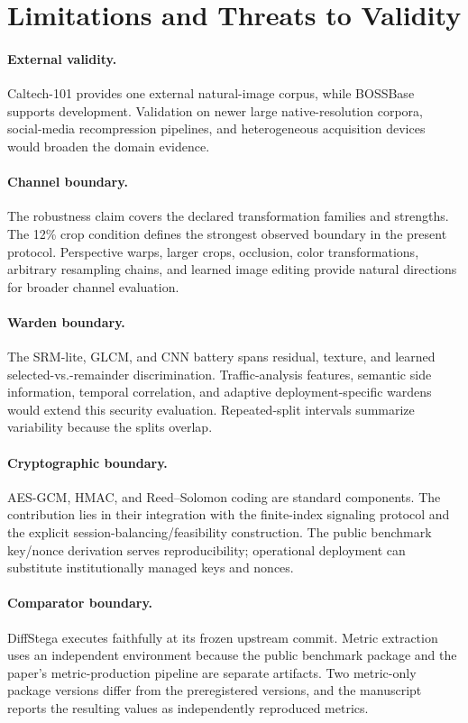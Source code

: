 \section{Limitations and Threats to Validity}
\label{sec:limitations}

\paragraph{External validity.} Caltech-101 provides one external natural-image corpus, while BOSSBase supports development. Validation on newer large native-resolution corpora, social-media recompression pipelines, and heterogeneous acquisition devices would broaden the domain evidence.

\paragraph{Channel boundary.} The robustness claim covers the declared transformation families and strengths. The 12\% crop condition defines the strongest observed boundary in the present protocol. Perspective warps, larger crops, occlusion, color transformations, arbitrary resampling chains, and learned image editing provide natural directions for broader channel evaluation.

\paragraph{Warden boundary.} The SRM-lite, GLCM, and CNN battery spans residual, texture, and learned selected-vs.-remainder discrimination. Traffic-analysis features, semantic side information, temporal correlation, and adaptive deployment-specific wardens would extend this security evaluation. Repeated-split intervals summarize variability because the splits overlap.

\paragraph{Cryptographic boundary.} AES-GCM, HMAC, and Reed--Solomon coding are standard components. The contribution lies in their integration with the finite-index signaling protocol and the explicit session-balancing/feasibility construction. The public benchmark key/nonce derivation serves reproducibility; operational deployment can substitute institutionally managed keys and nonces.

\paragraph{Comparator boundary.} DiffStega executes faithfully at its frozen upstream commit. Metric extraction uses an independent environment because the public benchmark package and the paper's metric-production pipeline are separate artifacts. Two metric-only package versions differ from the preregistered versions, and the manuscript reports the resulting values as independently reproduced metrics.
